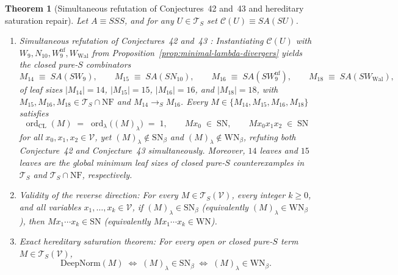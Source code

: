 \documentclass[11pt,reqno]{amsart}
\numberwithin{equation}{section}
\theoremstyle{plain}
\newtheorem{theorem}{Theorem}[section]
\theoremstyle{definition}
\theoremstyle{remark}
\DeclareMathOperator{\ord}{ord}
\newcommand{\TS}{\mathcal{T}_S}
\newcommand{\TSV}{\mathcal{T}_S(\mathcal{V})}
\newcommand{\NF}{\mathrm{NF}}
\newcommand{\SN}{\mathrm{SN}}
\newcommand{\WN}{\mathrm{WN}}
\newcommand{\redS}{\to_S}
\begin{document}
\begin{theorem}[Simultaneous refutation of Conjectures~42 and~43 and hereditary saturation repair]\label{thm:conjectures-42-43-refuted}
Let $A \equiv S S S$, and for any $U \in \TS$ set $\mathcal{C}(U) \equiv S A (S U)$.
\begin{enumerate}[label=(\roman*),leftmargin=2.2em]
  \item \emph{Simultaneous refutation of Conjectures~42 and~43 \cite[p.~102]{BarendregtEndrullisKlopWaldmann2017}:} Instantiating $\mathcal{C}(U)$ with $W_9, N_{10}, W_9^{\mathrm{nf}}, W_{\mathrm{Wal}}$ from Proposition~\ref{prop:minimal-lambda-divergers} yields the closed pure-$S$ combinators
  \[
    M_{14} \;\equiv\; S A (S W_9), \qquad M_{15} \;\equiv\; S A (S N_{10}), \qquad M_{16} \;\equiv\; S A (S W_9^{\mathrm{nf}}), \qquad M_{18} \;\equiv\; S A (S W_{\mathrm{Wal}}),
  \]
  of leaf sizes $|M_{14}| = 14$, $|M_{15}| = 15$, $|M_{16}| = 16$, and $|M_{18}| = 18$, with $M_{15}, M_{16}, M_{18} \in \TS \cap \NF$ and $M_{14} \redS M_{16}$. Every $M \in \{M_{14}, M_{15}, M_{16}, M_{18}\}$ satisfies
  \[
    \ord_{\mathrm{CL}}(M) \;=\; \ord_\lambda\bigl((M)_\lambda\bigr) \;=\; 1, \qquad M x_0 \;\in\; \SN, \qquad M x_0 x_1 x_2 \;\in\; \SN
  \]
  for all $x_0, x_1, x_2 \in \mathcal{V}$, yet $(M)_\lambda \notin \SN_\beta$ and $(M)_\lambda \notin \WN_\beta$, refuting both Conjecture~42 and Conjecture~43 simultaneously. Moreover, $14$ leaves and $15$ leaves are the global minimum leaf sizes of closed pure-$S$ counterexamples in $\TS$ and $\TS \cap \NF$, respectively.
  \item \emph{Validity of the reverse direction:} For every $M \in \TSV$, every integer $k \ge 0$, and all variables $x_1, \dots, x_k \in \mathcal{V}$, if $(M)_\lambda \in \SN_\beta$ (equivalently $(M)_\lambda \in \WN_\beta$), then $M x_1 \cdots x_k \in \SN$ (equivalently $M x_1 \cdots x_k \in \WN$).
  \item \emph{Exact hereditary saturation theorem:} For every open or closed pure-$S$ term $M \in \TSV$,
  \[
    \mathrm{DeepNorm}(M) \;\iff\; (M)_\lambda \in \SN_\beta \;\iff\; (M)_\lambda \in \WN_\beta.
  \]
\end{enumerate}
\end{theorem}
\end{document}
